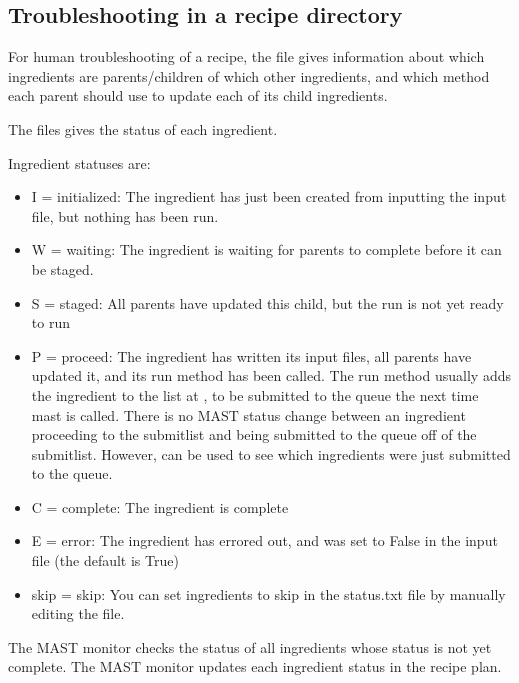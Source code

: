 \documentclass[letterpaper,10pt,english]{sphinxmanual}
\begin{document}
\subsection{Troubleshooting in a recipe directory}
\label{5_0_runningmast:troubleshooting-in-a-recipe-directory}
For human troubleshooting of a recipe, the  file gives information about which ingredients are parents/children of which other ingredients, and which method each parent should use to update each of its child ingredients.

The  files gives the status of each ingredient.

Ingredient statuses are:
\begin{itemize}
\item {} 
I = initialized: The ingredient has just been created from inputting the input file, but nothing has been run.

\item {} 
W = waiting: The ingredient is waiting for parents to complete before it can be staged.

\item {} 
S = staged: All parents have updated this child, but the run is not yet ready to run

\item {} 
P = proceed: The ingredient has written its input files, all parents have updated it, and its run method has been called. The run method usually adds the ingredient to the list at , to be submitted to the queue the next time mast is called. There is no MAST status change between an ingredient proceeding to the submitlist and being submitted to the queue off of the submitlist. However,  can be used to see which ingredients were just submitted to the queue.

\item {} 
C = complete: The ingredient is complete

\item {} 
E = error: The ingredient has errored out, and  was set to False in the input file (the default is True)

\item {} 
skip = skip: You can set ingredients to skip in the status.txt file by manually editing the file.

\end{itemize}

The MAST monitor checks the status of all ingredients whose status is not yet complete. The MAST monitor updates each ingredient status in the recipe plan.
\end{document}
